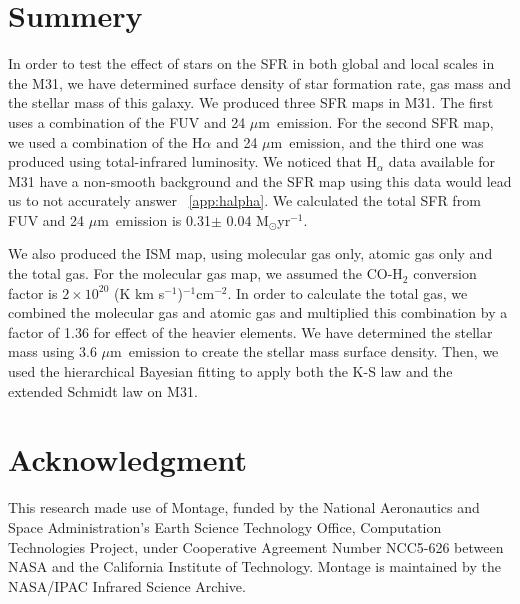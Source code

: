 \documentclass[useAMS,usenatbib]{mn2e}
\newcommand \um    {$\mu$m\ }
\begin{document}
\section{Summery}
In order to test the effect of stars on the SFR in both global and local scales in the M31, we have determined surface density of star formation rate, gas mass and the stellar mass of this galaxy. We produced three SFR maps in M31. The first uses a combination of the FUV and 24 \um emission. For the second SFR map, we used a combination of the H$\alpha$ and 24 \um emission, and the third one was produced using total-infrared luminosity. We noticed that H$_\alpha$ data available for M31 have a non-smooth background and the SFR map using this data would lead us to not accurately answer ~\ref{app:halpha}. We calculated the total SFR from FUV and 24 \um emission is 0.31$\pm$ 0.04 M$_{\odot}$yr$^{-1}$.

We also produced the ISM map, using molecular gas only, atomic gas only and the total gas. For the molecular gas map, we assumed the CO-H$_2$ conversion factor is $2 \times 10^{20}$ (K km s$^{-1}$)$^{-1}$cm$^{-2}$. In order to calculate the total gas, we combined the molecular gas and atomic gas and multiplied this combination by a factor of 1.36 for effect of the heavier elements. We have determined the stellar mass using 3.6 \um emission to create the stellar mass surface density. Then, we used the hierarchical Bayesian fitting to apply both the K-S law and the extended Schmidt law on M31.


\section*{Acknowledgment}
This research made use of Montage, funded by the National Aeronautics and Space Administration's Earth Science Technology Office, Computation Technologies Project, under Cooperative Agreement Number NCC5-626 between NASA and the California Institute of Technology. Montage is maintained by the NASA/IPAC Infrared Science Archive.
\newpage


\end{document}
